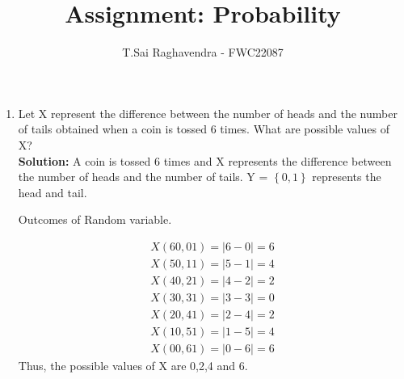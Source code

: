 \documentclass{article}
\providecommand{\brak}[1]{\ensuremath{\left\{#1\right\}}}
\newcommand{\solution}{\noindent \textbf{Solution: }}
\begin{document}
\title{Assignment: Probability}
\author{\Large T.Sai Raghavendra - FWC22087}
\date{}


\maketitle
\begin{enumerate}[label=13.\arabic{enumi}.\arabic{enumii}]%
\setcounter{enumi}{3}
\setcounter{enumii}{3}

\item Let X represent the difference between the number of heads and the number of tails obtained when a coin is tossed 6 times. What are possible values of X?\\

\solution
A coin is tossed 6 times and X represents the difference between the number of heads and the number of tails.
Y = $\brak{0,1}$ represents the head and tail.\\

	\begin{table}[h]
	\centering
	
	\caption{Outcomes of Random variable.}
	\label{tables:13.4.3.2}
	\end{table}
	
\begin{align}
X(60,01) = |6-0| = 6\\
X(50,11) = |5-1| = 4\\
X(40,21) = |4-2| = 2\\
X(30,31) = |3-3| = 0\\
X(20,41) = |2-4| = 2\\
X(10,51) = |1-5| = 4\\
X(00,61) = |0-6| = 6
\end{align}
Thus, the possible values of X are 0,2,4 and 6.
\end{enumerate}
\end{document}
